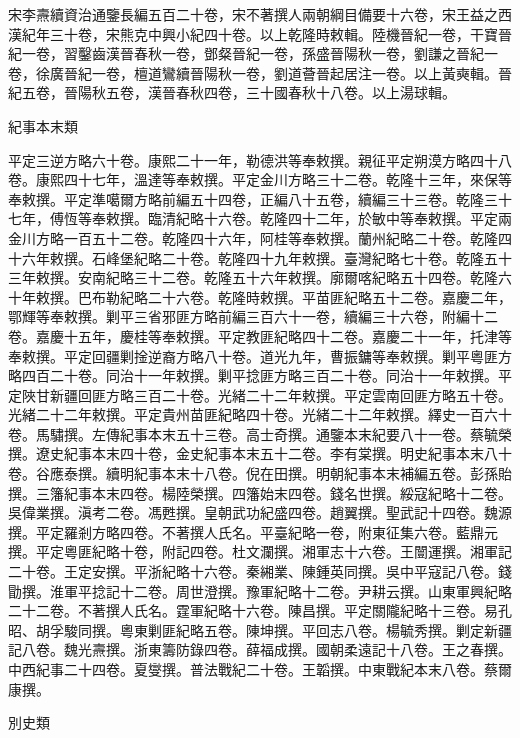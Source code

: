 \begin{pinyinscope}
宋李燾續資治通鑒長編五百二十卷，宋不著撰人兩朝綱目備要十六卷，宋王益之西漢紀年三十卷，宋熊克中興小紀四十卷。以上乾隆時敕輯。陸機晉紀一卷，干寶晉紀一卷，習鑿齒漢晉春秋一卷，鄧粲晉紀一卷，孫盛晉陽秋一卷，劉謙之晉紀一卷，徐廣晉紀一卷，檀道鸞續晉陽秋一卷，劉道薈晉起居注一卷。以上黃奭輯。晉紀五卷，晉陽秋五卷，漢晉春秋四卷，三十國春秋十八卷。以上湯球輯。

紀事本末類

平定三逆方略六十卷。康熙二十一年，勒德洪等奉敕撰。親征平定朔漠方略四十八卷。康熙四十七年，溫達等奉敕撰。平定金川方略三十二卷。乾隆十三年，來保等奉敕撰。平定準噶爾方略前編五十四卷，正編八十五卷，續編三十三卷。乾隆三十七年，傅恆等奉敕撰。臨清紀略十六卷。乾隆四十二年，於敏中等奉敕撰。平定兩金川方略一百五十二卷。乾隆四十六年，阿桂等奉敕撰。蘭州紀略二十卷。乾隆四十六年敕撰。石峰堡紀略二十卷。乾隆四十九年敕撰。臺灣紀略七十卷。乾隆五十三年敕撰。安南紀略三十二卷。乾隆五十六年敕撰。廓爾喀紀略五十四卷。乾隆六十年敕撰。巴布勒紀略二十六卷。乾隆時敕撰。平苗匪紀略五十二卷。嘉慶二年，鄂輝等奉敕撰。剿平三省邪匪方略前編三百六十一卷，續編三十六卷，附編十二卷。嘉慶十五年，慶桂等奉敕撰。平定教匪紀略四十二卷。嘉慶二十一年，托津等奉敕撰。平定回疆剿捦逆裔方略八十卷。道光九年，曹振鏞等奉敕撰。剿平粵匪方略四百二十卷。同治十一年敕撰。剿平捻匪方略三百二十卷。同治十一年敕撰。平定陜甘新疆回匪方略三百二十卷。光緒二十二年敕撰。平定雲南回匪方略五十卷。光緒二十二年敕撰。平定貴州苗匪紀略四十卷。光緒二十二年敕撰。繹史一百六十卷。馬驌撰。左傳紀事本末五十三卷。高士奇撰。通鑒本末紀要八十一卷。蔡毓榮撰。遼史紀事本末四十卷，金史紀事本末五十二卷。李有棠撰。明史紀事本末八十卷。谷應泰撰。續明紀事本末十八卷。倪在田撰。明朝紀事本末補編五卷。彭孫貽撰。三籓紀事本末四卷。楊陸榮撰。四籓始末四卷。錢名世撰。綏寇紀略十二卷。吳偉業撰。滇考二卷。馮甦撰。皇朝武功紀盛四卷。趙翼撰。聖武記十四卷。魏源撰。平定羅剎方略四卷。不著撰人氏名。平臺紀略一卷，附東征集六卷。藍鼎元撰。平定粵匪紀略十卷，附記四卷。杜文瀾撰。湘軍志十六卷。王闓運撰。湘軍記二十卷。王定安撰。平浙紀略十六卷。秦緗業、陳鍾英同撰。吳中平寇記八卷。錢勖撰。淮軍平捻記十二卷。周世澄撰。豫軍紀略十二卷。尹耕云撰。山東軍興紀略二十二卷。不著撰人氏名。霆軍紀略十六卷。陳昌撰。平定關隴紀略十三卷。易孔昭、胡孚駿同撰。粵東剿匪紀略五卷。陳坤撰。平回志八卷。楊毓秀撰。剿定新疆記八卷。魏光燾撰。浙東籌防錄四卷。薛福成撰。國朝柔遠記十八卷。王之春撰。中西紀事二十四卷。夏燮撰。普法戰紀二十卷。王韜撰。中東戰紀本末八卷。蔡爾康撰。

別史類


\end{pinyinscope}
